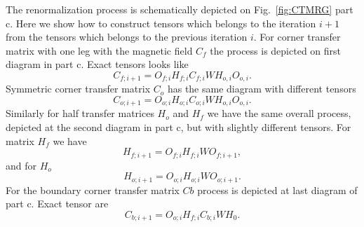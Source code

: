 \documentclass[showpacs,amssymb,twocolumn,floatfix,aps,pre,notitlepage]{revtex4-2}
\begin{document}
The renormalization process is schematically depicted on Fig.~\ref{fig:CTMRG} part c. Here we show how to construct tensors which belongs to the iteration $i+1$ from the tensors which belongs to the previous iteration $i$. For corner transfer matrix with one leg with the magnetic field $C_f$ the process is depicted on first diagram in part c.  Exact tensors looks like
\begin{equation}
C_{f;i+1} = O_{f;i}H_{f;i}C_{f;i}WH_{o,i}O_{o,i}.    
\end{equation}
Symmetric corner transfer matrix $C_o$ has the same diagram with different tensors
\begin{equation}
    C_{o;i+1} = O_{o;i}H_{o;i}C_{o;i}WH_{o,i}O_{o,i}.
\end{equation}
Similarly for half transfer matrices $H_o$ and $H_f$ we have the same overall process, depicted at the second diagram in part c, but with slightly different tensors. For matrix $H_f$ we have
\begin{equation}
H_{f;i+1} = O_{f;i}H_{f;i}WO_{f;i+1},    
\end{equation}
and for $H_o$
\begin{equation}
H_{o;i+1} = O_{o;i}H_{o;i}WO_{o;i+1}.    
\end{equation}
For the boundary corner transfer matrix $Cb$ process is depicted at last diagram of part c. Exact tensor are
\begin{equation}
C_{b;i+1} = O_{o;i}H_{f;i}C_{b;i}WH_{0}.    
\end{equation}
\end{document}
